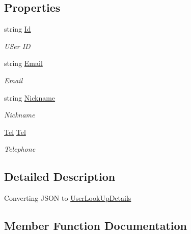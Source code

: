 \subsection*{Properties}
\begin{DoxyCompactItemize}
\item 
string \hyperlink{class_giift_a_p_i_c_sharp_1_1_user_look_up_details_aa3d73ffd4185c76275a1ccabaa12f6cd}{Id}
\begin{DoxyCompactList}\small\item\em U\+Ser ID \end{DoxyCompactList}\item 
string \hyperlink{class_giift_a_p_i_c_sharp_1_1_user_look_up_details_ab29eb0535546de8c06da6f52e67a5c7c}{Email}
\begin{DoxyCompactList}\small\item\em Email \end{DoxyCompactList}\item 
string \hyperlink{class_giift_a_p_i_c_sharp_1_1_user_look_up_details_af920de6393578f3cf18e124d04eab490}{Nickname}
\begin{DoxyCompactList}\small\item\em Nickname \end{DoxyCompactList}\item 
\hyperlink{class_giift_a_p_i_c_sharp_1_1_tel}{Tel} \hyperlink{class_giift_a_p_i_c_sharp_1_1_user_look_up_details_a37c59c5cf2edbd220e929df0c6456248}{Tel}
\begin{DoxyCompactList}\small\item\em Telephone \end{DoxyCompactList}\end{DoxyCompactItemize}


\subsection{Detailed Description}
Converting J\+S\+ON to \hyperlink{class_giift_a_p_i_c_sharp_1_1_user_look_up_details}{User\+Look\+Up\+Details} 



\subsection{Member Function Documentation}
\mbox{\label{class_giift_a_p_i_c_sharp_1_1_user_look_up_details_a0c7b1fdbdf0f59bdc6e2743ec1994219}} 
